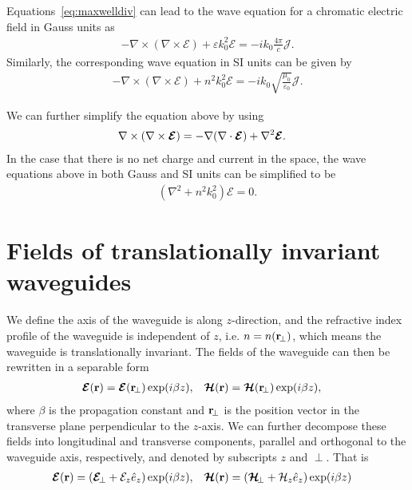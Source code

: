 Equations~\eqref{eq:maxwelldiv} can lead to the wave equation for a chromatic electric field in Gauss units as
\begin{align}
-\nabla \times (\nabla \times \boldsymbol{\mathcal{E}})+\varepsilon k_0^2\boldsymbol{\mathcal{E}}=-ik_0\frac{4\pi}{c} \boldsymbol{\mathcal{J}}. \label{eq:waveeqGaussU}
\end{align}
Similarly, the corresponding wave equation in SI units can be given by
\begin{align}
-\nabla \times (\nabla \times \boldsymbol{\mathcal{E}})+ n^2 k_0^2\boldsymbol{\mathcal{E}}=-ik_0\sqrt{\frac{\mu_0}{\varepsilon_0}} \boldsymbol{\mathcal{J}}.
\end{align}

We can further simplify the equation above by using 
\begin{align}
\nabla\times (\nabla\times \boldsymbol{\mathcal{E}}) &= -\nabla(\nabla\cdot \boldsymbol{\mathcal{E}})+ \nabla^2\boldsymbol{\mathcal{E}}. 
\end{align}
In the case that there is no net charge and current in the space, the wave equations above in both Gauss and SI units can be simplified to be
\begin{align}\label{eq:freespacewaveeq}
(\nabla^2 + n^2k_0^2) \boldsymbol{\mathcal{E}}=0.
\end{align}

\section{Fields of translationally invariant waveguides}
We define the axis of the waveguide is along $ z $-direction, and the refractive index profile of the 
waveguide is independent of $ z $, i.e. $ n=n(\mathbf{r}\!_\perp) $, which means the waveguide is 
translationally invariant. The fields of the waveguide can then be rewritten in a separable form
\begin{align}
\boldsymbol{\mathcal{E}}(\mathbf{r}) &= \boldsymbol{\mathcal{E}}(\mathbf{r}\!_\perp)\exp(i\beta z), & \boldsymbol{\mathcal{H}}(\mathbf{r}) &= \boldsymbol{\mathcal{H}}(\mathbf{r}\!_\perp)\exp(i\beta 
z),
\end{align}
where $ \beta $ is the propagation constant and $ \mathbf{r}\!_\perp $ is the position vector in the transverse 
plane perpendicular to the $ z $-axis. We can further decompose these fields into longitudinal and 
transverse components, parallel and orthogonal to the waveguide axis, respectively, and denoted by 
subscripts $ z $ and $ \perp $. That is
\begin{align}\label{EHtranslong}
\bmc{E}(\br) &= \left( \bmc{E}\!_\perp + \mathcal{E}_z \hat{e}_z \right)\exp(i\beta z), & \bmc{H}(\br) &= 
\left( \bmc{H}\!_\perp + \mathcal{H}_z \hat{e}_z\right) \exp(i\beta z)
\end{align}

